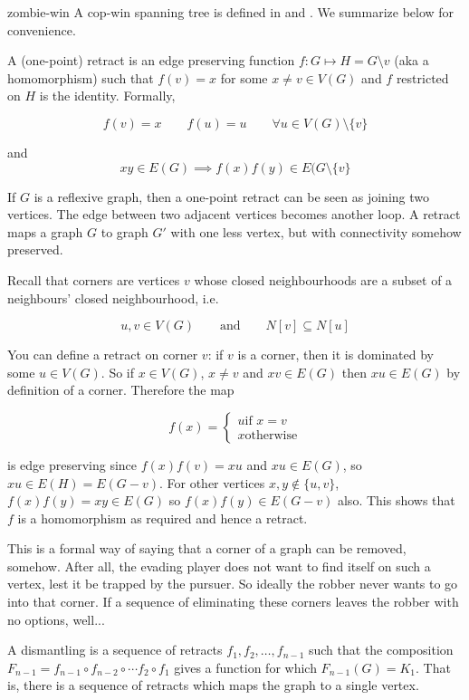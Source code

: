 zombie-win
A cop-win spanning tree is defined in \cite{fitzpatrick2016deterministic}
and \cite{clarke2002constrained}. We summarize below for convenience.

A (one-point) retract is an edge preserving function $f : G \mapsto H = G \setminus v$
(aka a homomorphism) such that $f(v) = x$ for some $x \neq v \in V(G)$ and $f$ restricted on $H$ is the identity.
Formally,

\[ f(v) = x \qquad f(u) = u \qquad \forall u \in V(G)\setminus \{ v \} \]

and
\[ xy \in E(G) \implies f(x)f(y) \in E(G \setminus \{ v \} \]

If $G$ is a reflexive graph, then a one-point retract can be seen as joining
two vertices. The edge between two adjacent vertices becomes another loop.
A retract maps a graph $G$ to graph $G'$ with one less vertex, but with connectivity
somehow preserved.

Recall that corners are vertices $v$ whose closed neighbourhoods
are a subset of a neighbours' closed neighbourhood, i.e.

\[u,v\in V(G) \qquad \text{and} \qquad N[v] \subseteq N[u] \]

You can define a retract on corner $v$: if $v$ is a corner, then it is
dominated by some $u \in V(G)$. So if $x \in V(G)$, $x \neq v$ and
$xv \in E(G)$ then $xu \in E(G)$ by definition of a corner. Therefore the map

\[ f(x) = \begin{cases}
u \text{if } x = v \\
x \text{otherwise}
\end{cases} \]

is edge preserving since $f(x)f(v) = xu$ and $xu \in E(G)$, so $xu \in E(H) = E(G - v)$.
For other vertices $x,y \not\in \{u,v\}$, $f(x)f(y) = xy \in E(G)$ so $f(x)f(y) \in E(G- v)$ also.
This shows that $f$ is a homomorphism as required and hence a retract.

This is a formal way of saying that a corner of a graph can be removed, somehow.
After all, the evading player does not want to find itself on such a vertex, lest
it be trapped by the pursuer. So ideally the robber never wants to go into that corner.
If a sequence of eliminating these corners leaves the robber with no options, well...

A dismantling is a sequence of retracts $f_1, f_2, \dots, f_{n-1}$ such that the
composition $F_{n-1} = f_{n-1} \circ f_{n-2} \circ \cdots f_2 \circ f_1$ gives a
function for which $F_{n-1} (G) = K_1$. That is, there is a sequence of retracts
which maps the graph to a single vertex.

